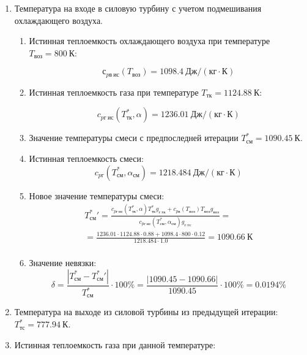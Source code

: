 \documentclass[a4paper,12pt]{article}
\begin{document}
\begin{enumerate}
	\item Температура на входе в силовую турбину с учетом подмешивания охлаждающего воздуха.
	\begin{enumerate}

		\item Истинная теплоемкость охлаждающего воздуха при температуре $T_{воз} = 800\ К $:

		\[
			с_{pв\ ис} (T_{воз}) = 1098.4\ Дж/(кг \cdot К)
		\]

		\item Истинная теплоемкость газа при температуре $T_{тк} = 1124.88\ К$:

		\[
			c_{pг\ ис} (T_{тк}^*, \alpha) = 1236.01\ Дж/(кг \cdot К)
		\]

		\item Значение температуры смеси с предпоследней итерации $T_{см}^* = 1090.45\ К$.

		\item Истинная теплоемкость смеси:
		\[
			c_{pг} (T_{см}^*, \alpha_{см}) = 1218.484\ Дж/(кг \cdot К)
		\]

		\item Новое значение температуры смеси:
		\begin{gather*}
			T_{см}^*\prime = \frac{
                        c_{pг\ ис} (T_{тк}^*, \alpha) T_{тк}^* g_{г.тк} + c_{pв} (T_{воз}) T_{воз} g_{воз}
                    }{
                        c_{pг\ ис} (T_{см}^{*}, \alpha_{см}) g_{г.тс}
                    } =\\
			= \frac{
                        1236.01 \cdot 1124.88 \cdot
						0.88 +
						1098.4 \cdot 800 \cdot
						0.12
                    }{
                        1218.484 \cdot  1.0
                    } =
			1090.66\ К\\
		\end{gather*}

		\item Значение невязки:
		\[
			\delta =\frac{ \left| T_{см}^{*} - T_{см}^*\prime \right| }{T_{см}^{*}} \cdot 100 \% =
				\frac{
                        \left| 1090.45 - 1090.66 \right|
                    }{
                        1090.45
                    } \cdot 100 \% =
			0.0194 \%
		\]


	\end{enumerate}
	
	\item Температура на выходе из силовой турбины из предыдущей итерации: $ T_{тс}^* = 777.94\ К$.

	\item Истинная теплоемкость газа при данной температуре:
	

\end{enumerate}
\end{document}
